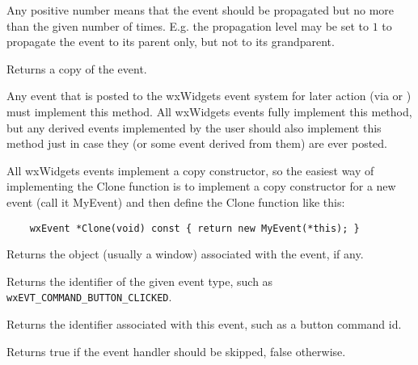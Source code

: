 Any positive number means that the event should be propagated but no more than
the given number of times. E.g. the propagation level may be set to $1$ to
propagate the event to its parent only, but not to its grandparent.


\label{wxeventclone}


Returns a copy of the event.

Any event that is posted to the wxWidgets event system for later action (via
 or
) must implement this method. All wxWidgets
events fully implement this method, but any derived events implemented by the
user should also implement this method just in case they (or some event
derived from them) are ever posted.

All wxWidgets events implement a copy constructor, so the easiest way of
implementing the Clone function is to implement a copy constructor for
a new event (call it MyEvent) and then define the Clone function like this:

\begin{verbatim}
    wxEvent *Clone(void) const { return new MyEvent(*this); }
\end{verbatim}


\label{wxeventgeteventobject}


Returns the object (usually a window) associated with the
event, if any.


\label{wxeventgeteventtype}


Returns the identifier of the given event type,
such as \texttt{wxEVT\_COMMAND\_BUTTON\_CLICKED}.


\label{wxeventgetid}


Returns the identifier associated with this event, such as a button command id.


\label{wxeventgetskipped}


Returns true if the event handler should be skipped, false otherwise.


